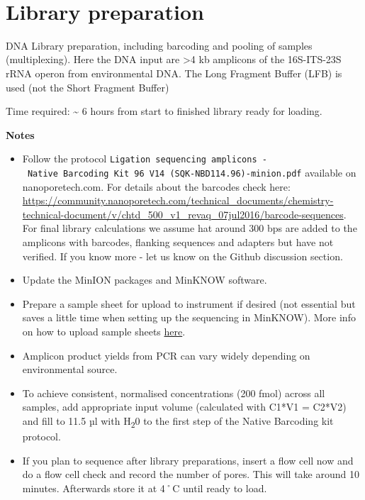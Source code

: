 \documentclass[
]{book}
\providecommand{\tightlist}{%
  \setlength{\itemsep}{0pt}\setlength{\parskip}{0pt}}
\begin{document}
~

\section{Library preparation}\label{library-preparation}

DNA Library preparation, including barcoding and pooling of samples (multiplexing). Here the DNA input are \textgreater4 kb amplicons of the 16S-ITS-23S rRNA operon from environmental DNA. The Long Fragment Buffer (LFB) is used (not the Short Fragment Buffer)

Time required: \textasciitilde{} 6 hours from start to finished library ready for loading.

\textbf{Notes}

\begin{itemize}
\tightlist
\item
  Follow the protocol \texttt{Ligation\ sequencing\ amplicons\ -\ Native\ Barcoding\ Kit\ 96\ V14\ (SQK-NBD114.96)-minion.pdf} available on nanoporetech.com. For details about the barcodes check here: \url{https://community.nanoporetech.com/technical_documents/chemistry-technical-document/v/chtd_500_v1_revaq_07jul2016/barcode-sequences}. For final library calculations we assume hat around 300 bps are added to the amplicons with barcodes, flanking sequences and adapters but have not verified. If you know more - let us know on the Github discussion section.
\item
  Update the MinION packages and MinKNOW software.
\item
  Prepare a sample sheet for upload to instrument if desired (not essential but saves a little time when setting up the sequencing in MinKNOW). More info on how to upload sample sheets \href{https://community.nanoporetech.com/docs/prepare/library_prep_protocols/experiment-companion-minknow/v/mke_1013_v1_revdc_11apr2016/sample-sheet-upload}{here}.
\item
  Amplicon product yields from PCR can vary widely depending on environmental source.
\item
  To achieve consistent, normalised concentrations (200 fmol) across all samples, add appropriate input volume (calculated with C1*V1 = C2*V2) and fill to 11.5 µl with H\textsubscript{2}0 to the first step of the Native Barcoding kit protocol.
\item
  If you plan to sequence after library preparations, insert a flow cell now and do a flow cell check and record the number of pores. This will take around 10 minutes. Afterwards store it at 4˚C until ready to load.
\end{itemize}
\end{document}
